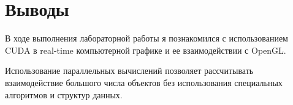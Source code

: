 \section{Выводы}
В ходе выполнения лабораторной работы я познакомился с использованием CUDA в real-time компьютерной графике и ее взаимодействии с OpenGL.

Использование параллельных вычислений позволяет рассчитывать взаимодействие большого числа объектов без использования специальных алгоритмов и структур данных.
\pagebreak
